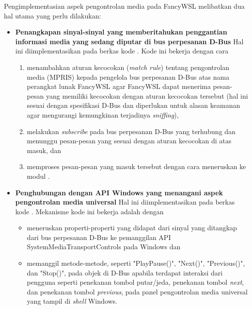 Pengimplementasian aspek pengontrolan media pada FancyWSL melibatkan dua hal utama yang perlu dilakukan:
\begin{itemize}
    \item \textbf{Penangkapan sinyal-sinyal yang memberitahukan penggantian informasi media yang sedang diputar di bus perpesanan D-Bus}
    Hal ini diimplementasikan pada berkas kode . Kode ini bekerja dengan cara
    \begin{enumerate}
        \item menambahkan aturan kecocokan (\textit{match rule}) tentang pengontrolan media (MPRIS) kepada pengelola bus perpesanan D-Bus atas nama perangkat lunak FancyWSL agar FancyWSL dapat menerima pesan-pesan yang memiliki kecocokan dengan aturan kecocokan tersebut (hal ini sesuai dengan spesifikasi D-Bus \cite{dbus-specification} dan diperlukan untuk alasan keamanan agar mengurangi kemungkinan terjadinya \textit{sniffing}),
        
        \item melakukan \textit{subscribe} pada bus perpesanan D-Bus yang terhubung dan menunggu pesan-pesan yang sesuai dengan aturan kecocokan di atas masuk, dan
        
        \item memproses pesan-pesan yang masuk tersebut dengan cara meneruskan ke modul .
    \end{enumerate}

    \item \textbf{Penghubungan dengan API Windows yang menangani aspek pengontrolan media universal}
    Hal ini diimplementasikan pada berkas kode . Mekanisme kode ini bekerja adalah dengan
    \begin{itemize}
        \item meneruskan properti-properti yang didapat dari sinyal yang ditangkap dari bus perpesanan D-Bus ke pemanggilan API SystemMediaTransportControls pada Windows dan
        
        \item memanggil metode-metode, seperti "PlayPause()", "Next()", "Previous()", dan "Stop()", pada objek  di D-Bus apabila terdapat interaksi dari pengguna seperti penekanan tombol putar/jeda, penekanan tombol \textit{next}, dan penekanan tombol \textit{previous}, pada panel pengontrolan media universal yang tampil di \textit{shell} Windows.
    \end{itemize}
\end{itemize}

